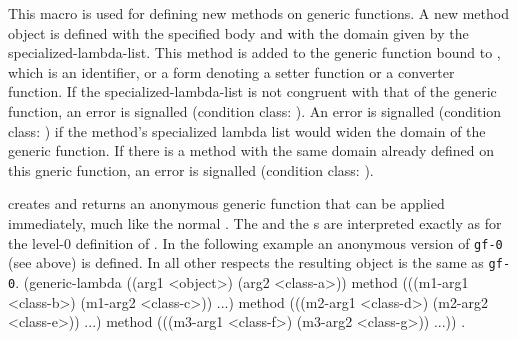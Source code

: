 \begin{optDefinition}
\Syntax
{}%
%
%
\remarks%
This macro is used for defining new methods on generic functions.  A new method
object is defined with the specified body and with the domain given by the
specialized-lambda-list.  This method is added to the generic function bound to
, which is an identifier, or a form denoting a setter function or
a converter function. If the specialized-lambda-list is not congruent with that
of the generic function, an error is signalled (condition class:
).  An error is signalled (condition
class: 
) if the method's specialized lambda
list would widen the domain of the generic function.  If there is a method with
the same domain already defined on this gneric function, an error is signalled
(condition class:
).

\Syntax
{}%
%
\remarks%
 creates and returns an anonymous generic function that
can be applied immediately, much like the normal .  The
 and the s are interpreted
exactly as for the level-0 definition of .  \examples In
the following example an anonymous version of {\tt gf-0} (see
 above) is defined.  In all other respects the resulting
object is the same as {\tt gf-0}.
%
{\codeExample
(generic-lambda ((arg1 <object>)
                 (arg2 <class-a>))
  method (((m1-arg1 <class-b>)
           (m1-arg2 <class-c>)) ...)
  method (((m2-arg1 <class-d>)
           (m2-arg2 <class-e>)) ...)
  method (((m3-arg1 <class-f>)
           (m3-arg2 <class-g>)) ...))
\endCodeExample}
%
\seealso%
.
%
\end{optDefinition}

